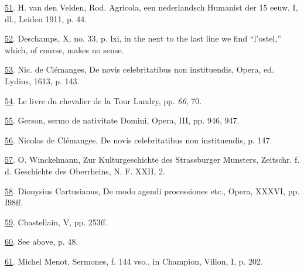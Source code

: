 \protect\hypertarget{23_NOTES.xhtmlux5cux23id_1170}{\protect\hyperlink{13_Chapter_Six__THE_DEPICTION_OF_TH.xhtmlux5cux23id_1169}{51}}.
H. van den Velden, Rod. Agricola, een nederlandsch Humanist der 15 eeuw,
I, dl., Leiden 1911, p. 44.

\protect\hypertarget{23_NOTES.xhtmlux5cux23id_1168}{\protect\hyperlink{13_Chapter_Six__THE_DEPICTION_OF_TH.xhtmlux5cux23id_1167}{52}}.
Deschamps, X, no. 33, p. lxi, in the next to the last line we find
``l'ostel,'' which, of course, makes no sense.

\protect\hypertarget{23_NOTES.xhtmlux5cux23id_1166}{\protect\hyperlink{13_Chapter_Six__THE_DEPICTION_OF_TH.xhtmlux5cux23id_1165}{53}}.
Nic. de Clémanges, De novis celebritatibus non instituendis, Opera, ed.
Lydius, 1613, p. 143.

\protect\hypertarget{23_NOTES.xhtmlux5cux23id_1164}{\protect\hyperlink{13_Chapter_Six__THE_DEPICTION_OF_TH.xhtmlux5cux23id_1163}{54}}.
Le livre du chevalier de la Tour Landry, pp. \emph{66}, 70.

\protect\hypertarget{23_NOTES.xhtmlux5cux23id_1162}{\protect\hyperlink{13_Chapter_Six__THE_DEPICTION_OF_TH.xhtmlux5cux23id_1161}{55}}.
Gerson, sermo de nativitate Domini, Opera, III, pp. 946, 947.

\protect\hypertarget{23_NOTES.xhtmlux5cux23id_1160}{\protect\hyperlink{13_Chapter_Six__THE_DEPICTION_OF_TH.xhtmlux5cux23id_1159}{56}}.
Nicolas de Clémanges, De novis celebritatibus non instituendis, p. 147.

\protect\hypertarget{23_NOTES.xhtmlux5cux23id_1158}{\protect\hyperlink{13_Chapter_Six__THE_DEPICTION_OF_TH.xhtmlux5cux23id_1157}{57}}.
O. Winckelmann, Zur Kulturgeschichte des Strassburger Munsters,
Zeitschr. f. d. Geschichte des Oberrheins, N. F. XXII, 2.

\protect\hypertarget{23_NOTES.xhtmlux5cux23id_1156}{\protect\hyperlink{13_Chapter_Six__THE_DEPICTION_OF_TH.xhtmlux5cux23id_1155}{58}}.
Dionysius Cartusianus, De modo agendi processiones etc., Opera, XXXVI,
pp. I98ff.

\protect\hypertarget{23_NOTES.xhtmlux5cux23id_1154}{\protect\hyperlink{13_Chapter_Six__THE_DEPICTION_OF_TH.xhtmlux5cux23id_1153}{59}}.
Chastellain, V, pp. 253ff.

\protect\hypertarget{23_NOTES.xhtmlux5cux23id_1152}{\protect\hyperlink{13_Chapter_Six__THE_DEPICTION_OF_TH.xhtmlux5cux23id_1151}{60}}.
See above, p. 48.

\protect\hypertarget{23_NOTES.xhtmlux5cux23id_1150}{\protect\hyperlink{13_Chapter_Six__THE_DEPICTION_OF_TH.xhtmlux5cux23id_1149}{61}}.
Michel Menot, Sermones, f. 144 vso., in Champion, Villon, I, p. 202.

